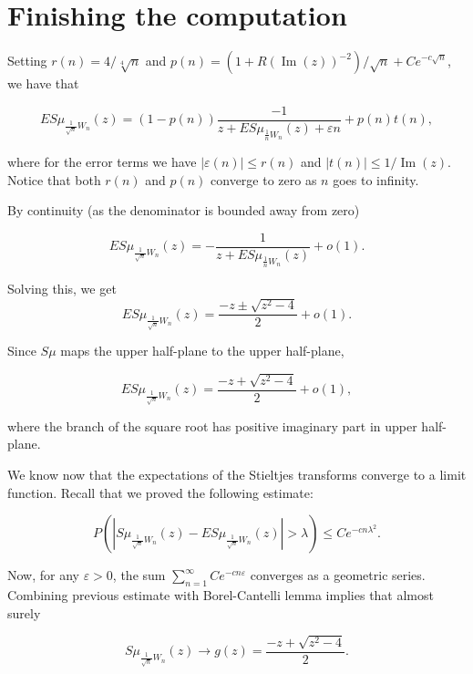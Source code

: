 \documentclass[12pt,a4paper,leqno]{report}
\newcommand{\eps}{\varepsilon}
\renewcommand{\Im}{\operatorname{Im}}
\theoremstyle{plain}
\theoremstyle{definition}
\theoremstyle{remark}
\begin{document}
\section{Finishing the computation}

Setting $r(n) = 4/\sqrt[4]{n}$ and $p(n)= (1+R(\Im(z))^{-2})/\sqrt{n} + Ce^{-c\sqrt{n}}$, we have that

\begin{equation*}
ES\mu_{\frac{1}{\sqrt{n}}W_n}(z) = (1-p(n)) \frac{-1}{z+ES\mu_{\frac{1}{n}W_n}(z) + \eps{n}} + p(n)t(n),
\end{equation*}

where for the error terms we have $|\eps(n)|\leq r(n)$ and $|t(n)| \leq 1/\Im(z)$. Notice that both $r(n)$ and $p(n)$ converge to zero as $n$ goes to infinity.


By continuity (as the denominator is bounded away from zero) 

\begin{equation*}
ES\mu_{\frac{1}{\sqrt{n}}W_n}(z) = -\frac{1}{z+ES\mu_{\frac{1}{n}W_n}(z)} + o(1).
\end{equation*}

Solving this, we get
\begin{equation*}
ES\mu_{\frac{1}{\sqrt{n}}W_n}(z) = \frac{-z \pm \sqrt{z^2 - 4}}{2} +o(1).
\end{equation*}

Since $S\mu$ maps the upper half-plane to the upper half-plane,  

\begin{equation*}
ES\mu_{\frac{1}{\sqrt{n}}W_n}(z) = \frac{-z + \sqrt{z^2 - 4}}{2} +o(1),
\end{equation*}

where the branch of the square root has positive imaginary part in upper half-plane.

We know now that the expectations of the Stieltjes transforms converge to a limit function. Recall that we proved the following estimate:

\begin{equation*}
P(|S\mu_{\frac{1}{\sqrt{n}}W_n}(z)- ES\mu_{\frac{1}{\sqrt{n}}W_n}(z)|>\lambda) \leq Ce^{-cn\lambda^2}.
\end{equation*} 

Now, for any $\eps>0$, the sum $\sum_{n=1}^{\infty} Ce^{-cn\varepsilon}$ converges as a geometric series. Combining previous estimate with Borel-Cantelli lemma implies that almost surely

\begin{equation*}
S\mu_{\frac{1}{\sqrt{n}}W_n}(z) \to g(z) = \frac{-z + \sqrt{z^2-4}}{2}.
\end{equation*}
\end{document}
